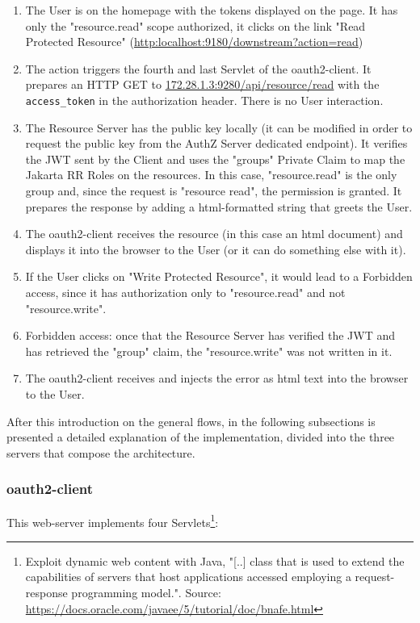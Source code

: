 \documentclass[a4paper,12pt]{article}
\begin{document}
\begin{enumerate}
    \item The User is on the homepage with the tokens displayed on the page. It has only the "resource.read" scope authorized, it clicks on the link "Read Protected Resource" (\url{http:localhost:9180/downstream?action=read})
    \item The action triggers the fourth and last Servlet of the oauth2-client. It prepares an HTTP GET to \url{172.28.1.3:9280/api/resource/read} with the \texttt{access\_token} in the authorization header. There is no User interaction.
    \item The Resource Server has the public key locally (it can be modified in order to request the public key from the AuthZ Server dedicated endpoint). It verifies the JWT sent by the Client and uses the "groups" Private Claim to map the Jakarta RR Roles on the resources. In this case, "resource.read" is the only group and, since the request is "resource read", the permission is granted. It prepares the response by adding a html-formatted string that greets the User.
    \item The oauth2-client receives the resource (in this case an html document) and displays it into the browser to the User (or it can do something else with it).
    \item If the User clicks on "Write Protected Resource", it would lead to a Forbidden access, since it has authorization only to "resource.read" and not "resource.write".
    \item Forbidden access: once that the Resource Server has verified the JWT and has retrieved the "group" claim, the "resource.write" was not written in it.
    \item The oauth2-client receives and injects the error as html text into the browser to the User.
\end{enumerate}

After this introduction on the general flows, in the following subsections is presented a detailed explanation of the implementation, divided into the three servers that compose the architecture.

\subsubsection{oauth2-client}
This web-server implements four Servlets\footnote{Exploit dynamic web content with Java, "[..] class that is used to extend the capabilities of servers that host applications accessed employing a request-response programming model.". Source: \url{https://docs.oracle.com/javaee/5/tutorial/doc/bnafe.html}}:
\end{document}
